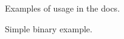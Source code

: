 
\begin{DoxyItemize}
\item Examples of usage in the docs.
\item Simple binary example. 
\end{DoxyItemize}